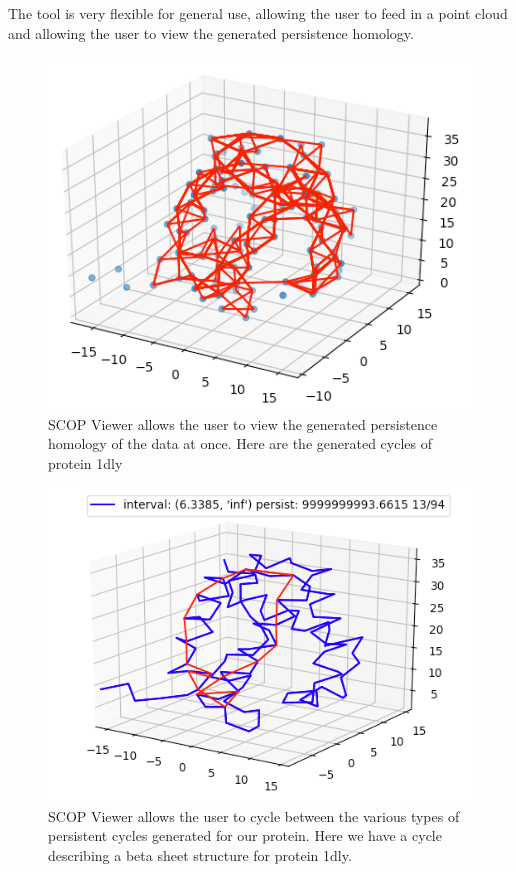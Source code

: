 \documentclass[12pt, a4paper, twocolumn, fullpage]{article}
\theoremstyle{plain}
\theoremstyle{definition}
\theoremstyle{remark}
\begin{document}
The tool is very flexible for general use, allowing the user to feed in a point cloud and allowing the user to view the generated persistence homology. 

\begin{figure}
    \includegraphics[width=\linewidth]{img/scopviewer/scopviewer1}
    \caption{SCOP Viewer allows the user to view the generated persistence homology of the data at once. Here are the generated cycles of protein 1dly}
    \label{}
\end{figure}

\begin{figure}
    \includegraphics[width=\linewidth]{img/scopviewer/scopviewer2}
    \caption{SCOP Viewer allows the user to cycle between the various types of persistent cycles generated for our protein. Here we have a cycle describing a beta sheet structure for protein 1dly. }
    \label{}
\end{figure}
\end{document}
